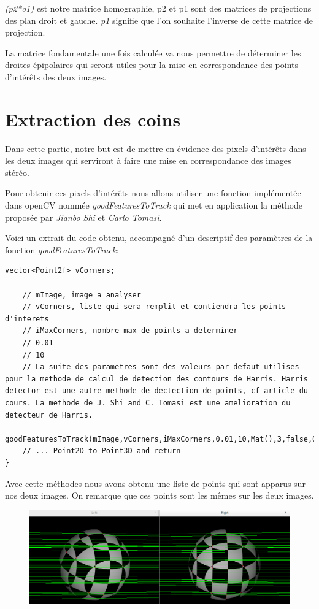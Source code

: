 \documentclass[a4paper,12pt]{report}
\begin{document}
\textit{(p2*o1)} est notre matrice homographie, p2 et p1 sont des matrices de projections des plan droit et gauche. \textit{p1\up{+}} signifie que l'on souhaite l'inverse de cette matrice de projection.

La matrice fondamentale une fois calculée va nous permettre de déterminer les droites épipolaires qui seront utiles pour la mise en correspondance des points d'intérêts des deux images.

\newpage

\section*{Extraction des coins}

Dans cette partie, notre but est de mettre en évidence des pixels d'intérêts dans les deux images qui serviront à faire une mise en correspondance des images stéréo.

Pour obtenir ces pixels d'intérêts nous allons utiliser une fonction implémentée dans openCV nommée \textit{goodFeaturesToTrack} qui met en application la méthode proposée par \textit{Jianbo Shi} et \textit{Carlo Tomasi}.

Voici un extrait du code obtenu, accompagné d'un descriptif des paramètres de la fonction \textit{goodFeaturesToTrack}:
\begin{lstlisting}[style=C++]
	vector<Point2f> vCorners;
    
    // mImage, image a analyser
    // vCorners, liste qui sera remplit et contiendra les points d'interets
    // iMaxCorners, nombre max de points a determiner
    // 0.01
    // 10
    // La suite des parametres sont des valeurs par defaut utilises pour la methode de calcul de detection des contours de Harris. Harris detector est une autre methode de dectection de points, cf article du cours. La methode de J. Shi and C. Tomasi est une amelioration du detecteur de Harris.
    goodFeaturesToTrack(mImage,vCorners,iMaxCorners,0.01,10,Mat(),3,false,0.04);
    // ... Point2D to Point3D and return
}
\end{lstlisting}

Avec cette méthodes nous avons obtenu une liste de points qui sont apparus sur nos deux images. On remarque que ces points sont les mêmes sur les deux images.

\begin{figure}[!ht]
	\center
	\includegraphics[scale=0.4]{./image/detect-corner.png}
\end{figure}
\end{document}
